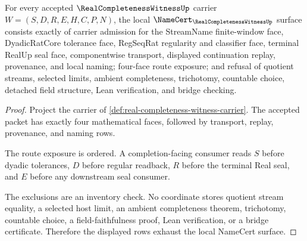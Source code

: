 \begin{theorem}
\label{thm:real-completeness-witness-namecert-obligations}
For every accepted $\RealCompletenessWitnessUp$ carrier $W=(S,D,R,E,H,C,P,N)$, the local $\NameCert_{\RealCompletenessWitnessUp}$ surface consists exactly of carrier admission for the StreamName finite-window face, DyadicRatCore tolerance face, RegSeqRat regularity and classifier face, terminal RealUp seal face, componentwise transport, displayed continuation replay, provenance, and local naming; four-face route exposure; and refusal of quotient streams, selected limits, ambient completeness, trichotomy, countable choice, detached field structure, Lean verification, and bridge checking.
\end{theorem}
\begin{proof}
Project the carrier of \autoref{def:real-completeness-witness-carrier}. The accepted packet has exactly four mathematical faces, followed by transport, replay, provenance, and naming rows.

The route exposure is ordered. A completion-facing consumer reads $S$ before dyadic tolerances, $D$ before regular readback, $R$ before the terminal Real seal, and $E$ before any downstream seal consumer.

The exclusions are an inventory check. No coordinate stores quotient stream equality, a selected host limit, an ambient completeness theorem, trichotomy, countable choice, a field-faithfulness proof, Lean verification, or a bridge certificate. Therefore the displayed rows exhaust the local NameCert surface.
\end{proof}

